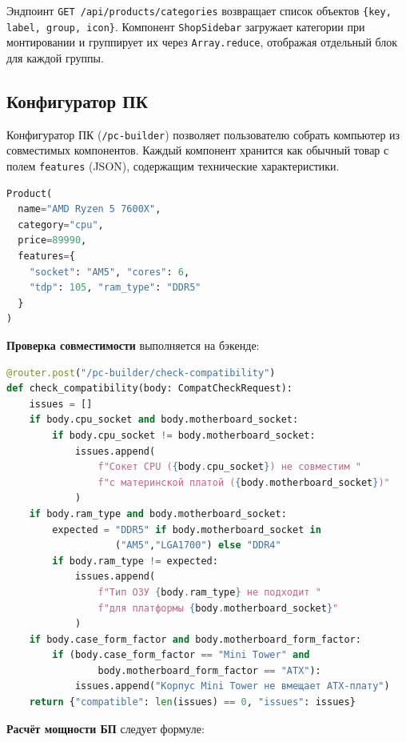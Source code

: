\documentclass[14pt,a4paper]{extreport}
\begin{document}
Эндпоинт \texttt{GET /api/products/categories} возвращает список объектов \texttt{\{key, label, group, icon\}}. Компонент \texttt{ShopSidebar} загружает категории при монтировании и группирует их через \texttt{Array.reduce}, отображая отдельный блок для каждой группы.

\subsection{Конфигуратор ПК}

Конфигуратор ПК (\texttt{/pc-builder}) позволяет пользователю собрать компьютер из совместимых компонентов. Каждый компонент хранится как обычный товар с полем \texttt{features} (JSON), содержащим технические характеристики.

\begin{lstlisting}[language=Python, caption={Пример продукта-процессора с features}]
Product(
  name="AMD Ryzen 5 7600X",
  category="cpu",
  price=89990,
  features={
    "socket": "AM5", "cores": 6,
    "tdp": 105, "ram_type": "DDR5"
  }
)
\end{lstlisting}

\textbf{Проверка совместимости} выполняется на бэкенде:

\begin{lstlisting}[language=Python, caption={Эндпоинт проверки совместимости (pc\_builder.py)}]
@router.post("/pc-builder/check-compatibility")
def check_compatibility(body: CompatCheckRequest):
    issues = []
    if body.cpu_socket and body.motherboard_socket:
        if body.cpu_socket != body.motherboard_socket:
            issues.append(
                f"Сокет CPU ({body.cpu_socket}) не совместим "
                f"с материнской платой ({body.motherboard_socket})"
            )
    if body.ram_type and body.motherboard_socket:
        expected = "DDR5" if body.motherboard_socket in
                   ("AM5","LGA1700") else "DDR4"
        if body.ram_type != expected:
            issues.append(
                f"Тип ОЗУ {body.ram_type} не подходит "
                f"для платформы {body.motherboard_socket}"
            )
    if body.case_form_factor and body.motherboard_form_factor:
        if (body.case_form_factor == "Mini Tower" and
                body.motherboard_form_factor == "ATX"):
            issues.append("Корпус Mini Tower не вмещает ATX-плату")
    return {"compatible": len(issues) == 0, "issues": issues}
\end{lstlisting}

\textbf{Расчёт мощности БП} следует формуле:
\end{document}
